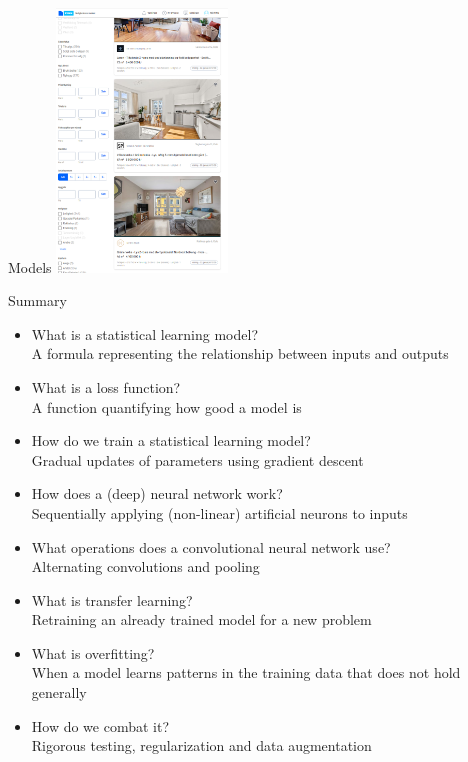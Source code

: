 \documentclass[8pt]{beamer}
\begin{document}
	\begin{frame}{Models} %
		\centering
		\vfill
		\includegraphics[height=7cm]{data/finn.png}
		\vfill
	\end{frame}

	\begin{frame}{Summary}
		\vfill
		\begin{itemize}
			\item{What is a statistical learning model?\\
				  \textcolor{answers}{A formula representing the relationship between inputs and outputs}}
			\item{What is a loss function?\\
				  \textcolor{answers}{A function quantifying how good a model is}}
			\item{How do we train a statistical learning model?\\
				  \textcolor{answers}{Gradual updates of parameters using gradient descent}}
			\item{How does a (deep) neural network work?\\
				  \textcolor{answers}{Sequentially applying (non-linear) artificial neurons to inputs}}
			\item{What operations does a convolutional neural network use?\\
				  \textcolor{answers}{Alternating convolutions and pooling}}
			\item{What is transfer learning?\\
				  \textcolor{answers}{Retraining an already trained model for a new problem}}
			\item{What is overfitting?\\
				  \textcolor{answers}{When a model learns patterns in the training data that does not hold generally}}
			\item{How do we combat it?\\
				  \textcolor{answers}{Rigorous testing, regularization and data augmentation}}
		\end{itemize}
		\vfill
	\end{frame}
\end{document}
